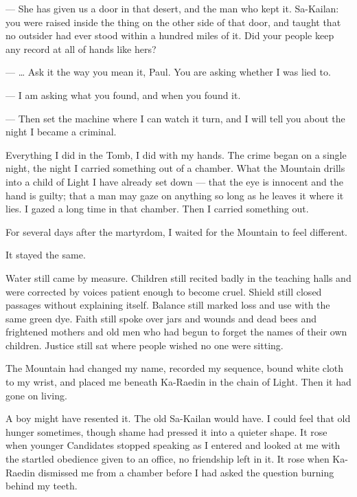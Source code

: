 
\begin{room}

--- She has given us a door in that desert, and the man who kept it. Sa-Kailan: you were raised inside the thing on the other side of that door, and taught that no outsider had ever stood within a hundred miles of it. Did your people keep any record at all of hands like hers?

--- \ldots{} Ask it the way you mean it, Paul. You are asking whether I was lied to.

--- I am asking what you found, and when you found it.

--- Then set the machine where I can watch it turn, and I will tell you about the night I became a criminal.

\end{room}

Everything I did in the Tomb, I did with my hands. The crime began on a single night, the night I carried something out of a chamber. What the Mountain drills into a child of Light I have already set down --- that the eye is innocent and the hand is guilty; that a man may gaze on anything so long as he leaves it where it lies. I gazed a long time in that chamber. Then I carried something out.\par

\ornament

For several days after the martyrdom, I waited for the Mountain to feel different.\par

It stayed the same.\par

Water still came by measure.
Children still recited badly in the teaching halls and were corrected by voices patient enough to become cruel.
Shield still closed passages without explaining itself.
Balance still marked loss and use with the same green dye.
Faith still spoke over jars and wounds and dead bees and frightened mothers and old men who had begun to forget the names of their own children.
Justice still sat where people wished no one were sitting.\par

The Mountain had changed my name, recorded my sequence, bound white cloth to my wrist, and placed me beneath Ka-Raedin in the chain of Light.
Then it had gone on living.\par

A boy might have resented it. The old Sa-Kailan would have. I could feel that old hunger sometimes, though shame had pressed it into a quieter shape. It rose when younger Candidates stopped speaking as I entered and looked at me with the startled obedience given to an office, no friendship left in it. It rose when Ka-Raedin dismissed me from a chamber before I had asked the question burning behind my teeth.\par

